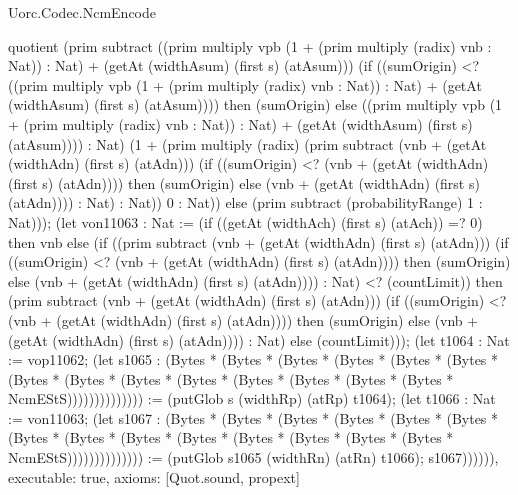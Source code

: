 \begin{lexlean}{Uorc.Codec.NcmEncode}
\begin{semanticmodule}
{quotient (prim subtract ((prim multiply vpb (1 + (prim multiply (radix) vnb : Nat)) : Nat) + (getAt (widthAsum) (first s) (atAsum))) (if ((sumOrigin) <? ((prim multiply vpb (1 + (prim multiply (radix) vnb : Nat)) : Nat) + (getAt (widthAsum) (first s) (atAsum)))) then (sumOrigin) else ((prim multiply vpb (1 + (prim multiply (radix) vnb : Nat)) : Nat) + (getAt (widthAsum) (first s) (atAsum)))) : Nat) (1 + (prim multiply (radix) (prim subtract (vnb + (getAt (widthAdn) (first s) (atAdn))) (if ((sumOrigin) <? (vnb + (getAt (widthAdn) (first s) (atAdn)))) then (sumOrigin) else (vnb + (getAt (widthAdn) (first s) (atAdn)))) : Nat) : Nat)) 0 : Nat)) else (prim subtract (probabilityRange) 1 : Nat))); (let von11063 : Nat := (if ((getAt (widthAch) (first s) (atAch)) =? 0) then vnb else (if ((prim subtract (vnb + (getAt (widthAdn) (first s) (atAdn))) (if ((sumOrigin) <? (vnb + (getAt (widthAdn) (first s) (atAdn)))) then (sumOrigin) else (vnb + (getAt (widthAdn) (first s) (atAdn)))) : Nat) <? (countLimit)) then (prim subtract (vnb + (getAt (widthAdn) (first s) (atAdn))) (if ((sumOrigin) <? (vnb + (getAt (widthAdn) (first s) (atAdn)))) then (sumOrigin) else (vnb + (getAt (widthAdn) (first s) (atAdn)))) : Nat) else (countLimit))); (let t1064 : Nat := vop11062; (let s1065 : (Bytes * (Bytes * (Bytes * (Bytes * (Bytes * (Bytes * (Bytes * (Bytes * (Bytes * (Bytes * (Bytes * (Bytes * (Bytes * (Bytes * NcmEStS)))))))))))))) := (putGlob s (widthRp) (atRp) t1064); (let t1066 : Nat := von11063; (let s1067 : (Bytes * (Bytes * (Bytes * (Bytes * (Bytes * (Bytes * (Bytes * (Bytes * (Bytes * (Bytes * (Bytes * (Bytes * (Bytes * (Bytes * NcmEStS)))))))))))))) := (putGlob s1065 (widthRn) (atRn) t1066); s1067)))))),
  executable: true,
  axioms: [Quot.sound, propext]
}


\end{semanticmodule}
\end{lexlean}
